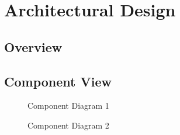 \documentclass[english]{article}
\begin{document}
\newpage

\section{Architectural Design}

\subsection{Overview}

\subsection{Component View}

\begin{figure}[H]
	\centering
	\caption{Component Diagram 1}
	\label{componentdiagram1}
\end{figure}
\begin{figure}[H]
	\centering
	\caption{Component Diagram 2}
	\label{componentdiagram2}
\end{figure}
\end{document}
